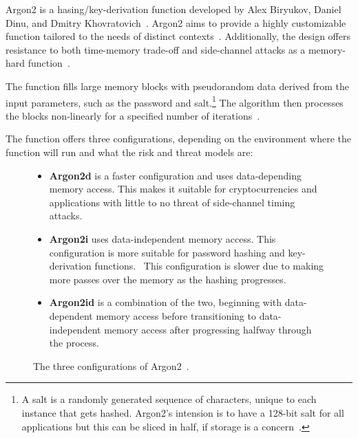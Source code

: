 Argon2 is a hasing/key-derivation function developed by Alex Biryukov, Daniel
Dinu, and Dmitry Khovratovich~\cite{argon2specs}.
Argon2 aims to provide a highly customizable function
tailored to the needs of distinct contexts~\cite{argon2specs}.
Additionally, the design offers resistance to both time-memory trade-off and
side-channel attacks as a memory-hard function~\cite{argon2specs}.

The function fills large memory blocks with pseudorandom data derived from the
input parameters, such as the password and salt.\footnote{
  A salt is a randomly generated sequence of characters, unique to each instance
  that gets hashed. Argon2's intension is to have a 128-bit salt for all
  applications but this can be sliced in half, if storage is a
  concern~\cite{argon2specs}.
}
The algorithm then processes the blocks non-linearly for a specified number of
iterations~\cite{argon2specs}.

The function offers three configurations, depending on the environment where the
function will run and what the risk and threat models are:

\begin{figure}[htbp]
  \centering
  \begin{itemize}
    \item \textbf{Argon2d} is a faster configuration and uses data-depending
    memory access.
    This makes it suitable for cryptocurrencies and applications with little to
    no threat of side-channel timing attacks.\protect\footnotemark
    \item \textbf{Argon2i} uses data-independent memory access.
    This configuration is more suitable for password hashing and key-derivation
    functions.\protect\footnotemark
    ~This configuration is slower due to making more passes over the memory as
    the hashing progresses.
    \item \textbf{Argon2id} is a combination of the two, beginning with
    data-dependent memory access before transitioning to data-independent
    memory access after progressing halfway through the process.
  \end{itemize}
  \caption{The three configurations of Argon2~\cite{argon2specs}.}
  \label{fig:argon2conf}
\end{figure}



